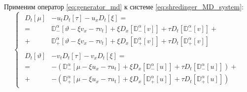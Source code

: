 \documentclass[a4paper, fontsize=14pt]{article}
\newcommand{\MD}[2]{\mathbb{D}_{#1}^{\alpha}[#2]} %
\newcommand{\D}[3]{D_{#1}^{#2} \left[ #3 \right]} %
\begin{document}
Применим оператор \eqref{eq:generator_md} к системе \eqref{eq:shredinger_MD_system}:
\begin{equation}
  \label{eq:def_md}
  \begin{cases}
    \begin{aligned}
      \D{t}{}{\mu} & - u_t \D{t}{}{\tau} - u_x \D{t}{}{\xi}  =                                                     \\
      =            & \MD{-}{\vartheta  - \xi v_x - \tau v_t } + \xi \D{x}{}{\MD{-}{v}} + \tau \D{t}{}{\MD{-}{v}} + \\
      +            & \MD{+}{\vartheta  - \xi v_x - \tau v_t } + \xi \D{x}{}{\MD{+}{v}} + \tau \D{t}{}{\MD{+}{v}}
    \end{aligned} \\
    \begin{aligned}
      \D{t}{}{\vartheta } & - v_t \D{t}{}{\tau} - v_x \D{t}{}{\xi}  =                                              \\
      =                   & - \left(\MD{-}{\mu - \xi u_x - \tau u_t } + \xi \D{x}{}{\MD{-}{u}} + \tau \D{t}{}{\MD{-}{u}} \right)+ \\
      +                   & - \left(\MD{+}{\mu  - \xi u_x - \tau u_t } + \xi \D{x}{}{\MD{+}{u}} + \tau \D{t}{}{\MD{+}{u}}\right)
    \end{aligned}
  \end{cases}
\end{equation}
\end{document}
